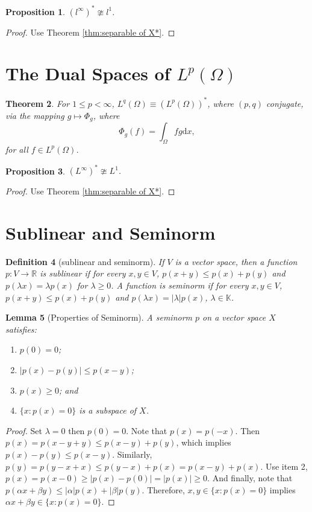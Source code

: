 \documentclass[12pt,a4paper]{report}
\numberwithin{equation}{section}
\theoremstyle{mystyle}
\newtheorem{definition}{Definition}[section]
\newtheorem{theorem}[definition]{Theorem}
\newtheorem{lemma}[definition]{Lemma}
\newtheorem{proposition}[definition]{Proposition}
\newcommand{\R}{\mathbb{R}}
\newcommand{\K}{\mathbb{K}}
\renewcommand{\d}{\mathrm{d}}
\newcommand{\abs}[1]{\left\lvert #1 \right\rvert}
\begin{document}
	\begin{proposition}
		$(l^\infty)^* \ncong l^1$.
	\end{proposition}
	\begin{proof}
		Use Theorem \ref{thm:separable of X*}.
	\end{proof}
	
	\section{The Dual Spaces of $L^p(\Omega)$}
	\begin{theorem}
		For $1\leq p <\infty$, $L^q(\Omega)\equiv (L^p(\Omega))^*$, where $(p,q)$ conjugate, via the mapping $g\mapsto \Phi_g$, where
		\begin{equation}
			\Phi_g(f)=\int_\Omega fg \d x,
		\end{equation}
		for all $f\in L^p(\Omega)$.
	\end{theorem}

	\begin{proposition}
		$(L^\infty)^* \ncong L^1$.
	\end{proposition}
	\begin{proof}
		Use Theorem \ref{thm:separable of X*}.
	\end{proof}

	\section{Sublinear and Seminorm}
	\begin{definition}[sublinear and seminorm]
		If $V$ is a vector space, then a function $p:V\to\R$ is \emph{sublinear} if for every $x,y\in V$, $p(x+y)\leq p(x)+p(y)$ and $p(\lambda x)=\lambda p(x)$ for $\lambda \geq 0$. A function is \emph{seminorm} if for every $x,y\in V$, $p(x+y)\leq p(x)+p(y)$ and $p(\lambda x)=\abs{\lambda}p(x)$, $\lambda\in \K$.
	\end{definition}
	
	\begin{lemma}[Properties of Seminorm]
		A seminorm $p$ on a vector space $X$ satisfies:
		\begin{enumerate}
			\item $p(0)=0$;
			\item $|p(x)-p(y)|\leq p(x-y)$;
			\item $p(x)\geq 0$; and
			\item $\{x: p(x)=0\}$ is a subspace of $X$.
		\end{enumerate}
	\end{lemma}
	\begin{proof}
		Set $\lambda =0$ then $p(0)=0$. Note that $p(x)=p(-x)$. Then $p(x)=p(x-y+y)\leq p(x-y)+p(y)$, which implies $p(x)-p(y)\leq p(x-y)$. Similarly, $p(y)=p(y-x+x)\leq p(y-x)+p(x)=p(x-y)+p(x)$. Use item 2, $p(x)=p(x-0)\geq |p(x)-p(0)|=|p(x)|\geq 0$. And finally, note that $p(\alpha x+\beta y)\leq |\alpha|p(x)+|\beta|p(y)$. Therefore, $x,y\in \{x: p(x)=0\}$ implies $\alpha x+\beta y\in \{x: p(x)=0\}$.
	\end{proof}
\end{document}
